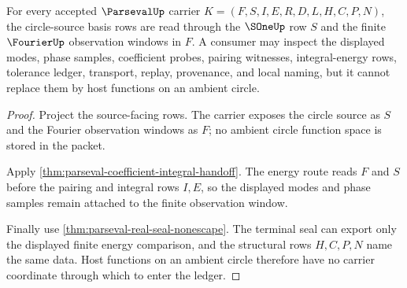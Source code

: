 \begin{theorem}
\label{thm:parseval-sone-basis-ledger}
For every accepted $\ParsevalUp$ carrier $K=(F,S,I,E,R,D,L,H,C,P,N)$, the circle-source basis rows are read through the $\SOneUp$ row $S$ and the finite $\FourierUp$ observation windows in $F$. A consumer may inspect the displayed modes, phase samples, coefficient probes, pairing witnesses, integral-energy rows, tolerance ledger, transport, replay, provenance, and local naming, but it cannot replace them by host functions on an ambient circle.
\end{theorem}
\begin{proof}
Project the source-facing rows. The carrier exposes the circle source as $S$ and the Fourier observation windows as $F$; no ambient circle function space is stored in the packet.

Apply \autoref{thm:parseval-coefficient-integral-handoff}. The energy route reads $F$ and $S$ before the pairing and integral rows $I,E$, so the displayed modes and phase samples remain attached to the finite observation window.

Finally use \autoref{thm:parseval-real-seal-nonescape}. The terminal seal can export only the displayed finite energy comparison, and the structural rows $H,C,P,N$ name the same data. Host functions on an ambient circle therefore have no carrier coordinate through which to enter the ledger.
\end{proof}


